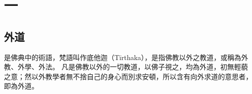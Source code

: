 \section{一}

\subsection{外道}
是佛典中的術語，梵語叫作底他迦（Tīrthaka），是指佛教以外之教道，或稱為外教、外學、外法。
凡是佛教以外的一切教道，以佛子視之，均為外道，初無輕藐之意；然以外教學者無不捨自己的身心而別求安頓，所以含有向外求道的意思者，即為外道。      
